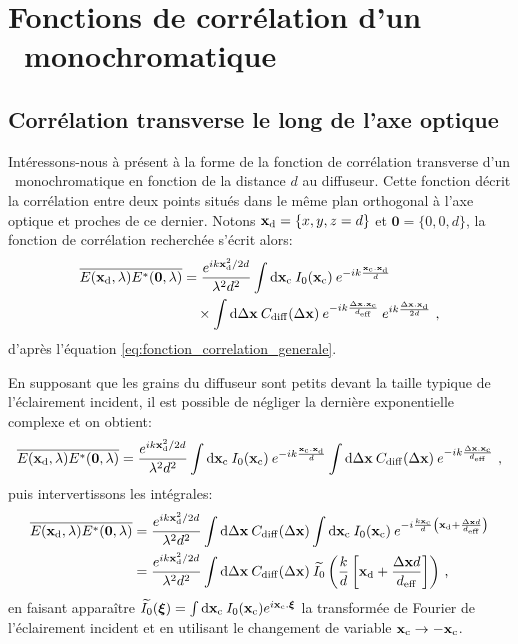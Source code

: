 \section{Fonctions de corrélation d'un \speckle\ monochromatique}
\subsection{Corrélation transverse le long de l'axe optique}
Intéressons-nous à présent à la forme de la fonction de corrélation transverse d'un \speckle\ monochromatique en fonction de la distance $d$ au diffuseur. Cette fonction décrit la corrélation entre deux points situés dans le même plan orthogonal à l'axe optique et proches de ce dernier. Notons $\mathbf{x}_{\mathrm{d}}=\lbrace x,y,z=d\rbrace$ et $\mathbf{0}=\lbrace 0,0,d \rbrace$, la fonction de corrélation recherchée s'écrit alors:
\begin{align}
\overline{E(\mathbf{x}_{\mathrm{d}},\lambda)E^*(\mathbf{0},\lambda)} &= \frac{e^{i k \mathbf{x}_{\mathrm{d}}^2/2d}}{\lambda^2 d^2} \int{\mathop{}\mathopen{}\mathrm{d}\mathbf{x}_{\mathrm{c}}\: I_0(\mathbf{x}_{\mathrm{c}}) \: e^{-i k \frac{\mathbf{x}_{\mathrm{c}}.\mathbf{x}_{\mathrm{d}}}{d}}} \\
&\nonumber \quad \times \int{\mathop{}\mathopen{}\mathrm{d}\Delta\mathbf{x}\: C_{\mathrm{diff}}(\Delta\mathbf{x}) \: e^{-ik \frac{\Delta\mathbf{x}. \mathbf{x}_{\mathrm{c}}}{d_{\mathrm{eff}}}} \: e^{ik \frac{\Delta\mathbf{x}. \mathbf{x}_{\mathrm{d}}}{2d}}} \text{ ,}
\end{align}
d'après l'équation \ref{eq:fonction_correlation_generale}.

En supposant que les grains du diffuseur sont petits devant la taille typique de l'éclairement incident, il est possible de négliger la dernière exponentielle complexe et on obtient:
\begin{equation}
\overline{E(\mathbf{x}_{\mathrm{d}},\lambda)E^*(\mathbf{0},\lambda)} = \frac{e^{i k \mathbf{x}_{\mathrm{d}}^2/2d}}{\lambda^2 d^2} \int{\mathop{}\mathopen{}\mathrm{d}\mathbf{x}_{\mathrm{c}}\: I_0(\mathbf{x}_{\mathrm{c}}) \: e^{-i k \frac{\mathbf{x}_{\mathrm{c}}.\mathbf{x}_{\mathrm{d}}}{d}}}  \int{\mathop{}\mathopen{}\mathrm{d}\Delta\mathbf{x}\: C_{\mathrm{diff}}(\Delta\mathbf{x}) \: e^{-ik \frac{\Delta\mathbf{x}. \mathbf{x}_{\mathrm{c}}}{d_{\mathrm{eff}}}} } \text{ ,}
\end{equation}
puis intervertissons les intégrales:
\begin{align}
\overline{E(\mathbf{x}_{\mathrm{d}},\lambda)E^*(\mathbf{0},\lambda)}&=\frac{e^{ik \mathbf{x}_{\mathrm{d}}^2/2d}}{\lambda^2 d^2} \int{\mathop{}\mathopen{}\mathrm{d}\Delta\mathbf{x}\: C_{\mathrm{diff}}(\Delta\mathbf{x}) \int{\mathop{}\mathopen{}\mathrm{d}\mathbf{x}_{\mathrm{c}}\: I_0(\mathbf{x}_{\mathrm{c}}) \: e^{-i\frac{k\mathbf{x}_{\mathrm{c}}}{d} \left(\mathbf{x}_{\mathrm{d}}+\frac{\Delta\mathbf{x}d}{d_{\mathrm{eff}}}\right)}}} \\
&= \frac{e^{ik\mathbf{x}_{\mathrm{d}}^2/2d}}{\lambda^2 d^2} \int{\mathop{}\mathopen{}\mathrm{d}\Delta\mathbf{x}\: C_{\mathrm{diff}}(\Delta\mathbf{x}) \: \widetilde{I_0}\left( \frac{k}{d}\left[ \mathbf{x}_{\mathrm{d}}+ \frac{\Delta\mathbf{x}d}{d_{\mathrm{eff}}} \right]\right)} \text{ ,}
\end{align}
en faisant apparaître $\widetilde{I_0}(\boldsymbol{\xi})=\int{\mathop{}\mathopen{}\mathrm{d}\mathbf{x}_{\mathrm{c}}\: I_0(\mathbf{x}_{\mathrm{c}}) e^{i\mathbf{x}_{\mathrm{c}}.\boldsymbol{\xi}}}$ la transformée de Fourier de l'éclairement incident et en utilisant le changement de variable $\mathbf{x}_{\mathrm{c}}\rightarrow - \mathbf{x}_{\mathrm{c}}$.

